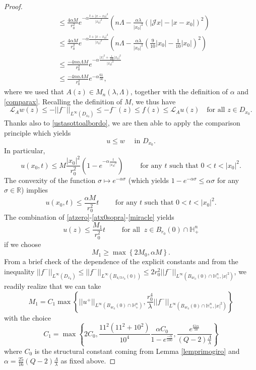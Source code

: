 \documentclass[12pt]{amsart}
\newcommand{\R}{{\mathbb R}}
\newcommand{\J}{\mathcal{J}}
\def \H {{\mathbb H}}
\def \L {\mathcal{L}}
\begin{document}
\begin{proof}
\begin{align*}
& \leq \frac{4\alpha M}{r_0^2}e^{-\alpha\frac{t+|x-x_0|^2}{|x_0|^2}}\left( n\Lambda -\frac{\alpha\lambda}{|x_0|^2}\left( |\J x| - |x-x_0|\right)^2 \right)\\
&\leq \frac{4\alpha M}{r_0^2}e^{-\alpha\frac{t+|x-x_0|^2}{|x_0|^2}}\left( n\Lambda -\frac{\alpha\lambda}{|x_0|^2}\left( \frac{9}{10}|x_0| -  \frac{1}{10}|x_0|\right)^2 \right)\\
& \leq \frac{-4n\alpha\Lambda M}{r_0^2}e^{-\alpha\frac{|x|^2+\frac{1}{100}|x_0|^2}{|x_0|^2}} \\
& \leq \frac{-4n\alpha\Lambda M}{r_0^2}e^{-\alpha\frac{61}{50}},
\end{align*}
where we used that $A(z) \in M_n(\lambda, \Lambda)$, together with the definition of $\alpha$ and \eqref{comparax}. Recalling the definition of $M$, we thus have
$$
\L_A w (z)\leq -||f^-||_{L^\infty(D_{x_0})} \leq -f^-(z)\leq f(z)\leq \L_A u (z)
 \quad \text{for all } z \in D_{x_0}.$$
Thanks also to \eqref{ustasottoalbordo}, we are then able to apply the comparison principle which yields
$$
u\leq w \quad \mbox{ in }D_{x_0}.
$$
In particular,
$$
u(x_0,t)\leq M \frac{|x_0|^2}{r_0^2}\left(1-e^{-\alpha\frac{t}{|x_0|^2}}\right)\qquad\mbox{ for any }t\mbox{ such that }0<t<|x_0|^2.
$$
The convexity of the function $\sigma\mapsto e^{-\alpha\sigma}$ (which yields $1-e^{-\alpha\sigma}\leq \alpha\sigma$ for any $\sigma\in\R$) implies
\begin{equation}\label{miracle}
u(x_0,t)\leq \frac{\alpha M}{r_0^2} t\qquad\mbox{ for any }t\mbox{ such that }0<t<|x_0|^2.
\end{equation}
The combination of \eqref{atzero}-\eqref{atx0sopra}-\eqref{miracle} yields
$$
u(z)\leq \frac{M_1}{r^2_0} t \qquad \text{ for all } \ z \in B_{r_0}(0)\cap \H^n_+
$$
if we choose
$$M_1\geq\max\left\{ 2M_0, \alpha M \right\}.$$
From a brief check of the dependence of the explicit constants and from the inequality $ ||f^-||_{L^\infty(D_{x_0})}\leq ||f^-||_{L^\infty(B_{4/3\, r_0}(0))}\leq 2 r^2_0 ||f^-||_{L^{\infty}(B_{4r_0}(0)\cap\H^n_+,|x|^2)}$, we readily realize that we can take
$$M_1=C_1\max\left\{ ||u^+||_{L^{\infty}(B_{4r_0}(0)\cap\H^n_+)}, 
\frac{r_0^4}{\lambda}||f^-||_{L^{\infty}(B_{4r_0}(0)\cap\H^n_+,|x|^2)}\right\}$$
with the choice 
$$C_1=\max\left\{ 2C_0, \frac{11^2(11^2+10^2)}{10^4} \frac{\alpha C_0}{1- e^{\frac{-\alpha}{100}}}, \frac{e^{\frac{61\alpha}{50}}}{(Q-2)\frac{\Lambda}{\lambda}} \right\}$$
where $C_0$ is the structural constant coming from Lemma \ref{lemprimogiro} and $\alpha=\frac{25}{16}(Q-2)\frac{\Lambda}{\lambda}$ as fixed above.
\end{proof}
\end{document}
